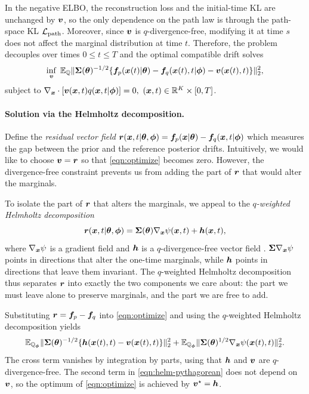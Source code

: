In the negative ELBO, the reconstruction loss and the initial-time KL are unchanged by $\boldsymbol{v}$, so the only dependence on the path law is through the path-space KL $\mathcal{L}_{\mathrm{path}}$. 
Moreover, since $\boldsymbol{v}$ is $q$-divergence-free, modifying it at time $s$ does not affect the marginal distribution at time $t$.
Therefore, the problem decouples over times $0 \leq t \leq T$ and the optimal compatible drift solves
\begin{equation}\label{eqn:optimize}
    \inf_{\boldsymbol{v}} \; \mathbb{E}_{\mathbb{Q}} \| \boldsymbol{\Sigma}(\boldsymbol{\theta})^{-1/2}\{\boldsymbol{f}_p(\boldsymbol{x}(t)| \boldsymbol{\theta}) -  \boldsymbol{f}_q(\boldsymbol{x}(t), t | \boldsymbol{\phi}) - \boldsymbol{v}(\boldsymbol{x}(t), t) \}\|_2^2, 
\end{equation}
subject to $\nabla_{\boldsymbol{x}} \cdot [\boldsymbol{v}(\boldsymbol{x}, t) q(\boldsymbol{x}, t | \boldsymbol{\phi})] = 0, \ (\boldsymbol{x}, t) \in \mathbb{R}^K \times [0, T]$.

\paragraph{Solution via the Helmholtz decomposition.}
Define the \emph{residual vector field} $\boldsymbol{r}(\boldsymbol{x},t | \boldsymbol{\theta}, \boldsymbol{\phi}) = \boldsymbol{f}_p(\boldsymbol{x} | \boldsymbol{\theta}) - \boldsymbol{f}_q(\boldsymbol{x}, t | \boldsymbol{\phi})$ which measures the gap between the prior and the reference posterior drifts. 
Intuitively, we would like to choose $\boldsymbol{v} = \boldsymbol{r}$ so that \cref{eqn:optimize} becomes zero. 
However, the divergence-free constraint  prevents us from adding the part of $\boldsymbol{r}$ that would alter the marginals. 

To isolate the part of $\boldsymbol{r}$ that alters the marginals, we appeal to the \emph{$q$-weighted Helmholtz decomposition}
\begin{equation}\label{eqn:helmholtz-decomp}
\boldsymbol{r}(\boldsymbol{x}, t | \boldsymbol{\theta}, \boldsymbol{\phi}) = \boldsymbol{\Sigma}(\boldsymbol{\theta})\nabla_{\boldsymbol{x}} \psi(\boldsymbol{x},t) + \boldsymbol{h}(\boldsymbol{x},t),
\end{equation}
where $\nabla_{\boldsymbol{x}} \psi$ is a gradient field and $\boldsymbol{h}$ is a $q$-divergence-free vector field \cite{bhatia2012helmholtz}.
$\boldsymbol{\Sigma} \nabla_{\boldsymbol{x}} \psi$ points in directions that alter the one-time marginals, while $\boldsymbol{h}$ points in directions that leave them invariant.
The $q$-weighted Helmholtz decomposition thus separates $\boldsymbol{r}$ into exactly the two components we care about: the part we must leave alone to preserve marginals, and the part we are free to add. 

Substituting $\boldsymbol{r} = \boldsymbol{f}_p - \boldsymbol{f}_q$ into \cref{eqn:optimize} and using the $q$-weighted Helmholtz decomposition yields
\begin{equation}\label{eqn:helm-pythagorean}
    \mathbb{E}_{\mathbb{Q}_{\boldsymbol{\phi}}} \| \boldsymbol{\Sigma}(\boldsymbol{\theta})^{-1/2}\{\boldsymbol{h}(\boldsymbol{x}(t), t) - \boldsymbol{v}(\boldsymbol{x}(t), t)\}\|_2^2 + \mathbb{E}_{\mathbb{Q}_{\boldsymbol{\phi}}}\|\boldsymbol{\Sigma}(\boldsymbol{\theta})^{1/2}  \nabla_{\boldsymbol{x}} \psi(\boldsymbol{x}(t), t)\|_2^2.
\end{equation}
The cross term vanishes by integration by parts, using that $\boldsymbol{h}$ and $\boldsymbol{v}$ are $q$-divergence-free. The second term in \cref{eqn:helm-pythagorean} does not depend on $\boldsymbol{v}$, so the optimum of  \cref{eqn:optimize} is achieved by $\boldsymbol{v}^\star = \boldsymbol{h}$. 

